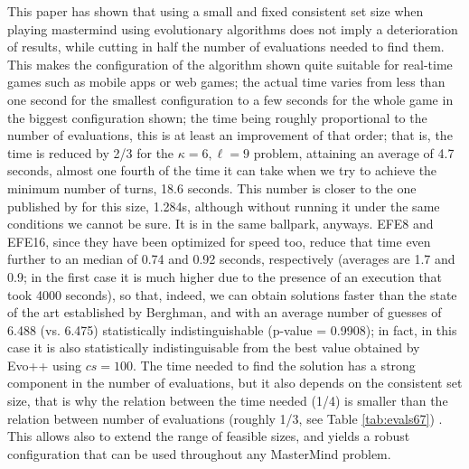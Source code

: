 \documentclass[conference]{IEEEtran}
\begin{document}
This paper has shown that using a small and fixed consistent set size
when playing mastermind using evolutionary algorithms does not imply a
deterioration of results, while cutting in half the number of
evaluations needed to find them. This makes the configuration of
the algorithm shown quite suitable for real-time games such as mobile apps
or web games; the actual time varies from less than one second for the
smallest configuration to a few seconds for the whole game in the
biggest configuration shown; the time being roughly proportional to
the number of evaluations, this is at least an improvement of that
order; that is, the time is reduced by 2/3 for the $\kappa=6,\ell=9$
problem, attaining an average of 4.7 seconds, almost one fourth of the
time it can take when we try to achieve the minimum number of turns,
18.6 seconds. This number is closer to the one published by
\cite{Berghman20091880} for this size, 1.284s, although without
running it under the same conditions we cannot be sure. It is in the
same ballpark, anyways. EFE8 and EFE16, since they have been optimized
for speed too, reduce that time even further to an median of 0.74 and
0.92 seconds, respectively (averages are 1.7 and 0.9; in the first
case it is much higher due to the presence of an execution that took
4000 seconds), so that, indeed, we can obtain solutions faster than
the state of the art established by Berghman, and with an average
number of guesses of 6.488 (vs. 6.475) statistically indistinguishable
(p-value = 0.9908); in fact, in this case it is also statistically
indistinguisable from the best value obtained by Evo++ using $cs=100$. 
The time needed to find the solution has a strong
component in the number of evaluations, but it also depends on the
consistent set size, that is why the relation between the time
needed (1/4) is smaller than the relation between number of
evaluations (roughly 1/3, see Table \ref{tab:evals67}) . This allows
also to extend the range of 
feasible sizes, and yields a robust configuration that can be used
throughout any MasterMind problem. 
\end{document}
